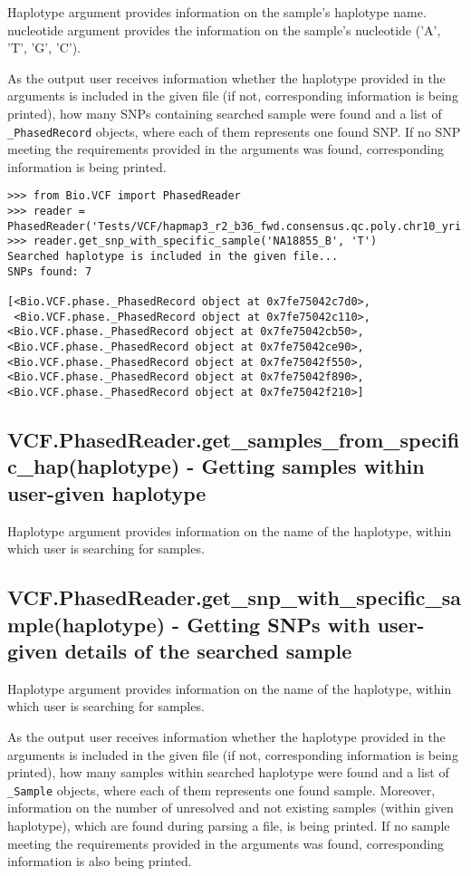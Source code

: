 \noindent Haplotype argument provides information on the sample's haplotype name.
nucleotide argument provides the information on the sample's nucleotide ('A', 'T', 'G', 'C'). 

\noindent As the output user receives information whether the haplotype provided in the arguments is included in the given file (if not, corresponding information 
is being printed), how many SNPs containing searched sample were found and a list of \verb|_PhasedRecord| objects, where each of them represents one found SNP. If no SNP
meeting the requirements provided in the arguments was found, corresponding information is being printed. 

\begin{verbatim}
>>> from Bio.VCF import PhasedReader
>>> reader = PhasedReader('Tests/VCF/hapmap3_r2_b36_fwd.consensus.qc.poly.chr10_yri.D.phased')
>>> reader.get_snp_with_specific_sample('NA18855_B', 'T')
Searched haplotype is included in the given file...
SNPs found: 7

[<Bio.VCF.phase._PhasedRecord object at 0x7fe75042c7d0>,
 <Bio.VCF.phase._PhasedRecord object at 0x7fe75042c110>, 
<Bio.VCF.phase._PhasedRecord object at 0x7fe75042cb50>,
<Bio.VCF.phase._PhasedRecord object at 0x7fe75042ce90>, 
<Bio.VCF.phase._PhasedRecord object at 0x7fe75042f550>, 
<Bio.VCF.phase._PhasedRecord object at 0x7fe75042f890>, 
<Bio.VCF.phase._PhasedRecord object at 0x7fe75042f210>]
\end{verbatim}

\subsection{VCF.PhasedReader.get\_samples\_from\_specific\_hap(haplotype) - Getting samples within user-given haplotype}

\noindent Haplotype argument provides information on the name of the haplotype, within which user is searching for samples.

\subsection{VCF.PhasedReader.get\_snp\_with\_specific\_sample(haplotype) - Getting SNPs with user-given details of the searched sample}

\noindent Haplotype argument provides information on the name of the haplotype, within which user is searching for samples.

\noindent As the output user receives information whether the haplotype provided in the arguments is included in the given file (if not, corresponding information 
is being printed), how many samples within searched haplotype were found and a list of \verb|_Sample| objects, where each of them represents one found sample. Moreover,
information on the number of unresolved and not existing samples (within given haplotype), which are found during parsing a file, is being printed. If no sample 
meeting the requirements provided in the arguments was found, corresponding information is also being printed.

